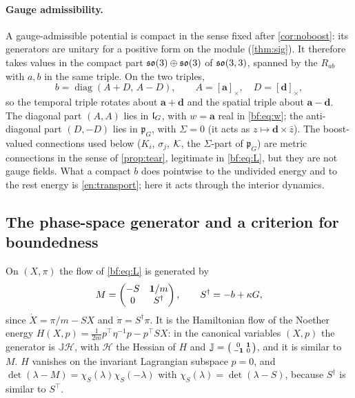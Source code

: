 \paragraph{Gauge admissibility.} A gauge-admissible potential is compact in the sense fixed after \cref{cor:noboost}: its generators are
unitary for a positive form on the module (\cref{thm:sig}). It therefore takes values in the compact part $\mathfrak{so}(3)\oplus\mathfrak{so}(3)$ of $\mathfrak{so}(3,3)$, spanned
by the $R_{ab}$ with $a,b$ in the same triple. On the two triples,
\begin{equation}
\label{bf:eq:compact}
b=\operatorname{diag}(A+D,\,A-D),\qquad A=[\mathbf a]_\times,\quad D=[\mathbf d]_\times,
\end{equation}
so the temporal triple rotates about $\mathbf a+\mathbf d$ and the spatial triple about $\mathbf a-\mathbf d$. The diagonal part $(A,A)$ lies in
$\mathfrak l_G$, with $w=\mathbf a$ real in \eqref{bf:eq:w}; the anti-diagonal part $(D,-D)$ lies in $\mathfrak p_G$, with $\Sigma=0$ (it acts as
$z\mapsto\mathbf d\times\bar z$). The boost-valued connections used below ($K_i$, $\sigma_j$, $\mathcal K$, the $\Sigma$-part of $\mathfrak p_G$) are metric
connections in the sense of \cref{prop:tear}, legitimate in \eqref{bf:eq:L}, but they are not gauge fields. What a compact $b$ does pointwise to
the undivided energy and to the rest energy is \cref{en:transport}; here it acts through the interior dynamics.

\subsection{The phase-space generator and a criterion for boundedness}
\label{sec:bf-criterion}

\begin{lemma}
\label{bf:M}
On $(X,\pi)$ the flow of \eqref{bf:eq:L} is generated by
\[
M=\begin{pmatrix}-S&\mathbf 1/m\\0&S^\dagger\end{pmatrix},\qquad S^\dagger=-b+\kappa G,
\]
since $\dot X=\pi/m-SX$ and $\dot\pi=S^\dagger\pi$. It is the Hamiltonian flow of the Noether energy $H(X,p)=\tfrac1{2m}p^{\!\top}\eta^{-1}p-p^{\!\top}SX$:
in the canonical variables $(X,p)$ the generator is $\mathbb J\mathcal H$, with $\mathcal H$ the Hessian of $H$ and
$\mathbb J=\bigl(\begin{smallmatrix}0&\mathbf 1\\-\mathbf 1&0\end{smallmatrix}\bigr)$, and it is similar to $M$. $H$ vanishes on the invariant Lagrangian subspace
$p=0$, and $\det(\lambda-M)=\chi_S(\lambda)\chi_S(-\lambda)$ with $\chi_S(\lambda)=\det(\lambda-S)$, because $S^\dagger$ is similar to $S^{\!\top}$.
\end{lemma}

